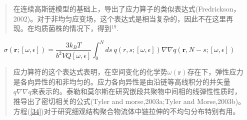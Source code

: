 \begin{quotation}
在连续高斯链模型的基础上，导出了应力算子的类似表达式(Fredrickson，2002)。对于非均匀应变场，这个表达式是相当复杂的，因此不在这里再现。在均质菌株的情况下，得到$^{19}$.
\end{quotation}
\begin{equation}\label{34}
\sigma(\mathbf{r};[\omega,\epsilon])=\frac{3k_BT}{b^2VQ[\omega,\epsilon]}\int_{0}^{N} ds~q(r,s;[\omega,\epsilon])\nabla \nabla q(\mathbf{r},N-s;[\omega,\epsilon])
\end{equation}
\begin{quotation}
应力算符的这个表达式表明，在空间变化的化学势$\omega(\mathbf{r})$存在下，弹性应力是各向异性的和非均匀的。应力各向异性是由沿链等高线积分的并矢量$q\nabla \nabla q$来表示的。泰勒和莫尔斯在研究嵌段共聚物中间相的线弹性性质时，推导出了密切相关的公式(Tyler and morse,2003a;Tyler and Morse,2003b)。方程(\ref{34})对于研究细观结构聚合物流体中链拉伸的不均匀分布特别有用。
\end{quotation}
